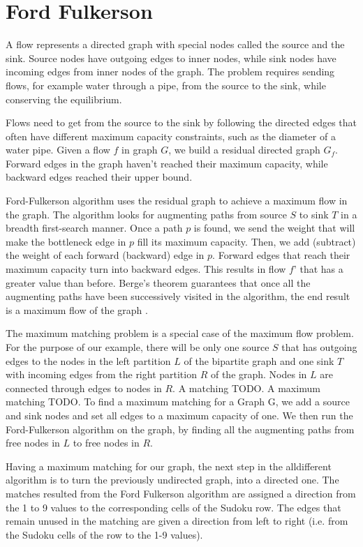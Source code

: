 \documentclass{l4proj}
\begin{document}
\section{Ford Fulkerson}
\noindent A flow represents a directed graph with special nodes called the source and the sink. Source nodes have outgoing edges to inner nodes, while sink nodes have incoming edges from inner nodes of the graph. The problem requires sending flows, for example water through a pipe, from the source to the sink, while conserving the equilibrium.

\noindent Flows need to get from the source to the sink by following the directed edges that often have different maximum capacity constraints, such as the diameter of a water pipe. Given a flow $f$ in graph $G$, we build a residual directed graph $G_f$. Forward edges in the graph haven’t reached their maximum capacity, while backward edges reached their upper bound. 

\noindent Ford-Fulkerson algorithm uses the residual graph to achieve a maximum flow in the graph. The algorithm looks for augmenting paths from source $S$ to sink $T$ in a breadth first-search manner. Once a path $p$ is found, we send the weight that will make the bottleneck edge in $p$ fill its maximum capacity. Then, we add (subtract) the weight of each forward (backward) edge in $p$. Forward edges that reach their maximum capacity turn into backward edges. This results in flow $f’$ that has a greater value than before. Berge’s theorem guarantees that once all the augmenting paths have been successively visited in the algorithm, the end result is a maximum flow of the graph \cite{berge1957two}.

\noindent The maximum matching problem is a special case of the maximum flow problem. For the purpose of our example, there will be only one source $S$ that has outgoing edges to the nodes in the left partition $L$ of the bipartite graph and one sink $T$ with incoming edges from the right partition $R$ of the graph. Nodes in $L$ are connected through edges to nodes in $R$. A matching TODO. A maximum matching TODO. To find a maximum matching for a Graph G, we add a source and sink nodes and set all edges to a maximum capacity of one. We then run the Ford-Fulkerson algorithm on the graph, by finding all the augmenting paths from free nodes in $L$ to free nodes in $R$.



\noindent Having a maximum matching for our graph, the next step in the alldifferent algorithm is to turn the previously undirected graph, into a directed one. The matches resulted from the Ford Fulkerson algorithm are assigned a direction from the 1 to 9 values to the corresponding cells of the Sudoku row. The edges that remain unused in the matching are given a direction from left to right (i.e. from the Sudoku cells of the row to the 1-9 values).
\end{document}
